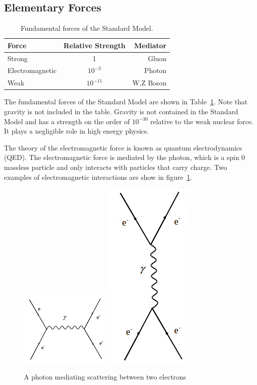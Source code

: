 \documentclass[oneside, letterpaper, oldfontcommands]{memoir}
\begin{document}
\subsection{Elementary Forces}\label{elemforces}

\begin{table}[htbp]
  \centering
  \begin{tabular}{ | l | c | r |}
    \hline
    Force & Relative Strength & Mediator \\ \hline \hline
    Strong & 1 & Gluon \\ \hline
    Electromagnetic & $10^{-3}$ & Photon \\ \hline
    Weak & $10 ^{-11}$ & W,Z Boson \\ \hline
    
  \end{tabular}
  \caption{Fundamental forces of the Standard Model\cite{Halzen:1984mc}.}
  \label{tab:FundForces}
\end{table}

\qquad The fundamental forces of the Standard Model are shown in Table~\ref{tab:FundForces}. Note that gravity is not included in the table. Gravity is not contained in the Standard Model and has a strength on the order of $10^{-30}$ \cite{Barger:0201058766} relative to the weak nuclear force. It plays a negligible role in high energy physics.

\qquad The theory of the electromagnetic force is known as quantum electrodynamics (QED). The electromagnetic force is mediated by the photon, which is a spin 0 massless particle and only interacts with particles that carry charge. Two examples of electromagnetic interactions are show in figure~\ref{fig:eeScattering}.

\begin{figure}[here]
\includegraphics[width=0.4\textwidth]{sChannelEE.png}
\includegraphics[height=0.4\textwidth]{tChannelEE.png}
\caption{A photon mediating scattering between two electrons}
\label{fig:eeScattering}
\end{figure}
\end{document}
